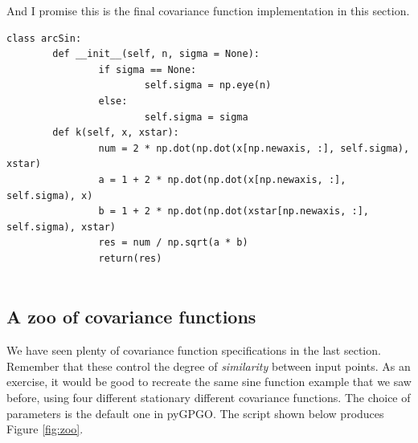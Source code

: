 \documentclass[10pt,a4paper,twoside]{book}
\begin{document}
And I promise this is the final covariance function implementation in this section.

\begin{verbatim}
class arcSin:
        def __init__(self, n, sigma = None):
                if sigma == None:
                        self.sigma = np.eye(n)
                else:
                        self.sigma = sigma
        def k(self, x, xstar):
                num = 2 * np.dot(np.dot(x[np.newaxis, :], self.sigma), xstar)
                a = 1 + 2 * np.dot(np.dot(x[np.newaxis, :], self.sigma), x)
                b = 1 + 2 * np.dot(np.dot(xstar[np.newaxis, :], self.sigma), xstar)
                res = num / np.sqrt(a * b)
                return(res)
   
\end{verbatim}

\subsection{A zoo of covariance functions}

We have seen plenty of covariance function specifications in the last section. Remember that these control the degree of \textit{similarity} between input points. As an exercise, it would be good to recreate the same sine function example that we saw before, using four different stationary different covariance functions. The choice of parameters is the default one in pyGPGO. The script shown below produces Figure \ref{fig:zoo}. 
\end{document}
